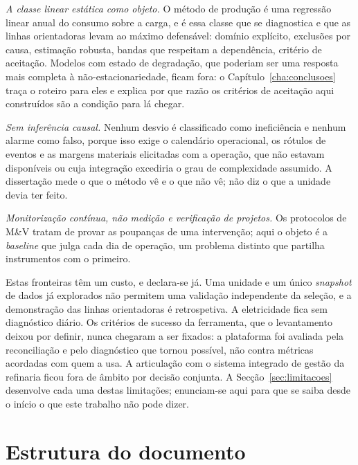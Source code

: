 \emph{A classe linear estática como objeto.} O método de produção é uma
regressão linear anual do consumo sobre a carga, e é essa classe que se
diagnostica e que as linhas orientadoras levam ao máximo defensável:
domínio explícito, exclusões por causa, estimação robusta, bandas que
respeitam a dependência, critério de aceitação. Modelos com estado de
degradação, que poderiam ser uma resposta mais completa à não-estacionariedade,
ficam fora: o Capítulo~\ref{cha:conclusoes} traça o roteiro para eles e
explica por que razão os critérios de aceitação aqui construídos são a
condição para lá chegar.

\emph{Sem inferência causal.} Nenhum desvio é classificado como
ineficiência e nenhum alarme como falso, porque isso exige o calendário
operacional, os rótulos de eventos e as margens materiais elicitadas
com a operação, que não estavam disponíveis ou cuja integração excediria o grau de complexidade assumido. A dissertação mede o que o
método vê e o que não vê; não diz o que a unidade devia ter feito.

\emph{Monitorização contínua, não medição e verificação de projetos.}
Os protocolos de M\&V tratam de provar as poupanças de uma intervenção;
aqui o objeto é a \emph{baseline} que julga cada dia de operação, um
problema distinto que partilha instrumentos com o primeiro.

Estas fronteiras têm um custo, e declara-se já. Uma unidade e um único
\emph{snapshot} de dados já explorados não permitem uma validação
independente da seleção, e a demonstração das linhas orientadoras é
retrospetiva.  A
eletricidade fica sem diagnóstico diário. Os
critérios de sucesso da ferramenta, que o levantamento deixou por
definir, nunca chegaram a ser fixados: a plataforma foi avaliada pela
reconciliação e pelo diagnóstico que tornou possível, não contra
métricas acordadas com quem a usa. A articulação com o sistema integrado
de gestão da refinaria ficou fora de âmbito por decisão conjunta. A
Secção~\ref{sec:limitacoes} desenvolve cada uma destas limitações;
enunciam-se aqui para que se saiba desde o início o que este trabalho
não pode dizer.

\section{Estrutura do documento}
\label{sec:estrutura}


